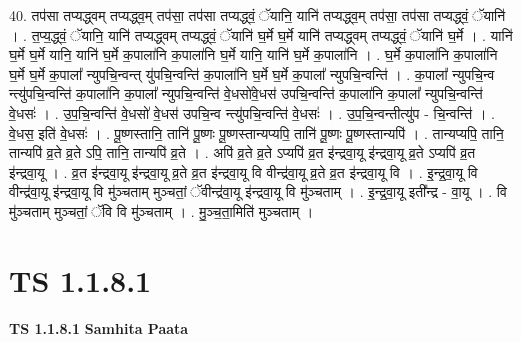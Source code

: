 \documentclass[17pt]{extarticle}
\begin{document}
40. तप॑सा तप्यद्ध्वम् तप्यद्ध्व॒म् तप॑सा॒ तप॑सा तप्यद्ध्वं॒ ॅयानि॒ यानि॑ तप्यद्ध्व॒म् तप॑सा॒ तप॑सा तप्यद्ध्वं॒ ॅयानि॑ । . त॒प्य॒द्ध्वं॒ ॅयानि॒ यानि॑ तप्यद्ध्वम् तप्यद्ध्वं॒ ॅयानि॑ घ॒र्मे घ॒र्मे यानि॑ तप्यद्ध्वम् तप्यद्ध्वं॒ ॅयानि॑ घ॒र्मे । . यानि॑ घ॒र्मे घ॒र्मे यानि॒ यानि॑ घ॒र्मे क॒पाला॑नि क॒पाला॑नि घ॒र्मे यानि॒ यानि॑ घ॒र्मे क॒पाला॑नि । . घ॒र्मे क॒पाला॑नि क॒पाला॑नि घ॒र्मे घ॒र्मे क॒पाला᳚ न्युपचि॒न्वन्त् यु॑पचि॒न्वन्ति॑ क॒पाला॑नि घ॒र्मे घ॒र्मे 
क॒पाला᳚ न्युपचि॒न्वन्ति॑ । . क॒पाला᳚ न्युपचि॒न्व न्त्यु॑पचि॒न्वन्ति॑ क॒पाला॑नि क॒पाला᳚ न्युपचि॒न्वन्ति॑ वे॒धसो॑वे॒धस॑ उपचि॒न्वन्ति॑ क॒पाला॑नि क॒पाला᳚ न्युपचि॒न्वन्ति॑ वे॒धसः॑ । . उ॒प॒चि॒न्वन्ति॑ वे॒धसो॑ वे॒धस॑ उपचि॒न्व न्त्यु॑पचि॒न्वन्ति॑ वे॒धसः॑ । . उ॒प॒चि॒न्वन्तीत्यु॑प - चि॒न्वन्ति॑ । . वे॒धस॒ इति॑ वे॒धसः॑ । . पू॒ष्णस्तानि॒ तानि॑ पू॒ष्णः पू॒ष्णस्तान्यप्यपि॒ तानि॑ पू॒ष्णः पू॒ष्णस्तान्यपि॑ । . तान्यप्यपि॒ तानि॒ तान्यपि॑ व्र॒ते व्र॒ते ऽपि॒ तानि॒ तान्यपि॑ व्र॒ते । . अपि॑ व्र॒ते व्र॒ते ऽप्यपि॑ व्र॒त इ॑न्द्रवा॒यू इ॑न्द्रवा॒यू व्र॒ते ऽप्यपि॑ व्र॒त इ॑न्द्रवा॒यू । . व्र॒त इ॑न्द्रवा॒यू इ॑न्द्रवा॒यू व्र॒ते व्र॒त इ॑न्द्रवा॒यू वि वीन्द्र॑वा॒यू व्र॒ते व्र॒त इ॑न्द्रवा॒यू वि । . इ॒न्द्र॒वा॒यू वि वीन्द्र॑वा॒यू इ॑न्द्रवा॒यू वि मु॑ञ्चताम् मुञ्चतां॒ ॅवीन्द्र॑वा॒यू इ॑न्द्रवा॒यू वि मु॑ञ्चताम् । . इ॒न्द्र॒वा॒यू इती᳚न्द्र - वा॒यू । . वि मु॑ञ्चताम् मुञ्चतां॒ ॅवि वि मु॑ञ्चताम् । . मु॒ञ्च॒ता॒मिति॑ मुञ्चताम् । \newline
\pagebreak
{}
\section*{ TS 1.1.8.1 }

\textbf{TS 1.1.8.1 } \newline
\textbf{Samhita Paata} \newline
\end{document}
